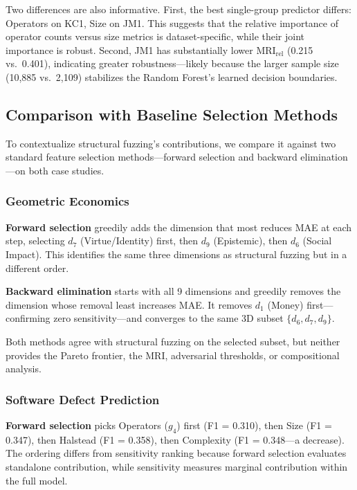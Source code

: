 \documentclass[manuscript,review,anonymous]{acmart}
\newcommand{\MRI}{\mathrm{MRI}}
\begin{document}
Two differences are also informative.
First, the best single-group predictor differs: Operators on KC1, Size on JM1.
This suggests that the relative importance of operator counts versus size metrics is dataset-specific, while their joint importance is robust.
Second, JM1 has substantially lower $\MRI_{\mathrm{rel}}$ (0.215 vs.\ 0.401), indicating greater robustness---likely because the larger sample size (10{,}885 vs.\ 2{,}109) stabilizes the Random Forest's learned decision boundaries.

\subsection{Comparison with Baseline Selection Methods}
\label{sec:baselines}

To contextualize structural fuzzing's contributions, we compare it against two standard feature selection methods---forward selection and backward elimination---on both case studies.

\subsubsection{Geometric Economics}

\textbf{Forward selection} greedily adds the dimension that most reduces MAE at each step, selecting $d_7$ (Virtue/Identity) first, then $d_9$ (Epistemic), then $d_6$ (Social Impact).
This identifies the same three dimensions as structural fuzzing but in a different order.

\textbf{Backward elimination} starts with all 9 dimensions and greedily removes the dimension whose removal least increases MAE.
It removes $d_1$ (Money) first---confirming zero sensitivity---and converges to the same 3D subset $\{d_6, d_7, d_9\}$.

Both methods agree with structural fuzzing on the selected subset, but neither provides the Pareto frontier, the MRI, adversarial thresholds, or compositional analysis.

\subsubsection{Software Defect Prediction}

\textbf{Forward selection} picks Operators ($g_4$) first (F1 = 0.310), then Size (F1 = 0.347), then Halstead (F1 = 0.358), then Complexity (F1 = 0.348---a decrease).
The ordering differs from sensitivity ranking because forward selection evaluates standalone contribution, while sensitivity measures marginal contribution within the full model.
\end{document}
